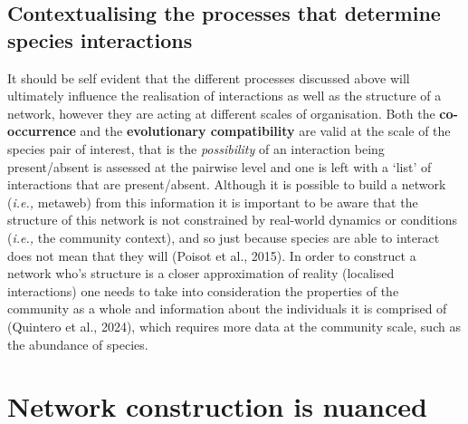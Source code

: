 \documentclass[
]{article}
\begin{document}
\subsection{Contextualising the processes that determine species
interactions}\label{contextualising-the-processes-that-determine-species-interactions}

It should be self evident that the different processes discussed above
will ultimately influence the realisation of interactions as well as the
structure of a network, however they are acting at different scales of
organisation. Both the \textbf{co-occurrence} and the
\textbf{evolutionary compatibility} are valid at the scale of the
species pair of interest, that is the \emph{possibility} of an
interaction being present/absent is assessed at the pairwise level and
one is left with a `list' of interactions that are present/absent.
Although it is possible to build a network (\emph{i.e.,} metaweb) from
this information it is important to be aware that the structure of this
network is not constrained by real-world dynamics or conditions
(\emph{i.e.,} the community context), and so just because species are
able to interact does not mean that they will (Poisot et al., 2015). In
order to construct a network who's structure is a closer approximation
of reality (localised interactions) one needs to take into consideration
the properties of the community as a whole and information about the
individuals it is comprised of (Quintero et al., 2024), which requires
more data at the community scale, such as the abundance of species.

\section{Network construction is
nuanced}\label{network-construction-is-nuanced}
\end{document}
